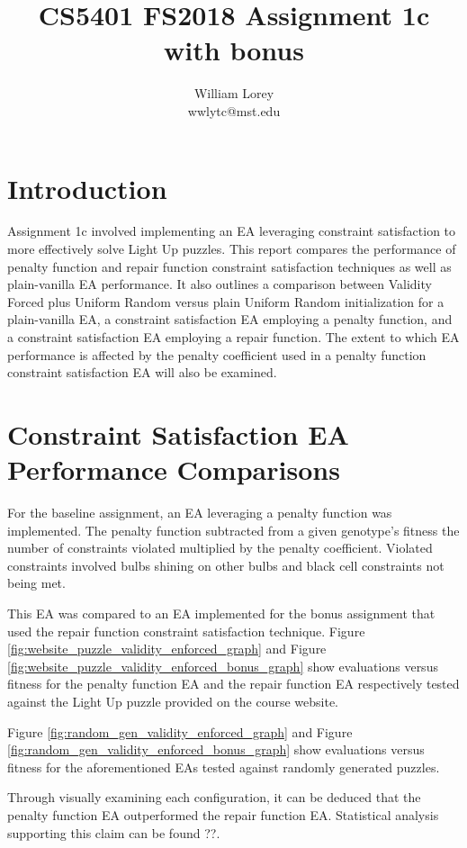 \documentclass[11pt]{article}
\title{CS5401 FS2018 Assignment 1c with bonus}
\author{William  Lorey \\ wwlytc@mst.edu}
\date{ }
\begin{document}
\maketitle

\tableofcontents

\section{Introduction}

Assignment 1c involved implementing an EA leveraging constraint satisfaction to
more effectively solve Light Up puzzles. This report compares the performance of
penalty function and repair function constraint satisfaction techniques as well as
plain-vanilla EA performance. It also outlines a comparison between Validity Forced plus 
Uniform Random versus plain Uniform Random initialization for a plain-vanilla EA,
a constraint satisfaction EA employing a penalty function, and a constraint satisfaction
EA employing a repair function. The extent to which EA performance is affected by 
the penalty coefficient used in a penalty function constraint satisfaction EA will also be examined.

\section{Constraint Satisfaction EA Performance Comparisons}

For the baseline assignment, an EA leveraging a penalty function was implemented. The penalty function
subtracted from a given genotype's fitness the number of constraints violated multiplied by the
penalty coefficient. Violated constraints involved bulbs shining on other bulbs and black cell
constraints not being met.

This EA was compared to an EA implemented for the bonus assignment that used the repair function
constraint satisfaction technique. Figure \ref{fig:website_puzzle_validity_enforced_graph} and Figure 
\ref{fig:website_puzzle_validity_enforced_bonus_graph} show evaluations versus fitness for the 
penalty function EA and the repair function EA respectively tested against the Light Up puzzle provided
on the course website.

Figure \ref{fig:random_gen_validity_enforced_graph} and Figure \ref{fig:random_gen_validity_enforced_bonus_graph} 
show evaluations versus fitness for the aforementioned EAs tested against randomly generated puzzles.

Through visually examining each configuration, it can be deduced that the penalty function EA 
outperformed the repair function EA. Statistical analysis supporting this claim can be found ??.
\end{document}

